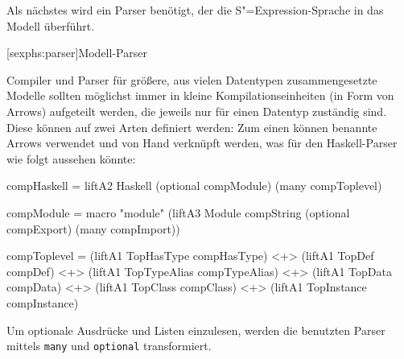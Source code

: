 \documentclass[11pt, a4paper, bibgerm]{scrbook}
\newenvironment{DIFnomarkup}{}{}
\newcommand\icode[1]{\lstinline?#1?}
\newcommand\lsection{}
\newcommand{\sexp}{S"=Expression}
\begin{document}
Als nächstes wird ein Parser benötigt, der die \sexp{}-Sprache in das
Modell überführt.

\lsection[sexphs:parser]{Modell-Parser}

Compiler und Parser für größere, aus vielen Datentypen zusammengesetzte Modelle
sollten möglichst immer in kleine Kompilationseinheiten (in Form von
Arrows) aufgeteilt werden, die jeweils nur für einen Datentyp zuständig
sind. Diese können auf zwei Arten definiert werden: Zum einen können
benannte Arrows verwendet und von Hand verknüpft werden, was für den
Haskell-Parser wie folgt aussehen könnte:
\begin{DIFnomarkup}\begin{code}
compHaskell = liftA2 Haskell (optional compModule) (many compToplevel)

compModule = macro "module" (liftA3 Module
                                    compString
                                    (optional compExport)
                                    (many compImport))

compToplevel = (liftA1 TopHasType   compHasType)   <+>
               (liftA1 TopDef       compDef)       <+>
               (liftA1 TopTypeAlias compTypeAlias) <+>
               (liftA1 TopData      compData)      <+>
               (liftA1 TopClass     compClass)     <+>
               (liftA1 TopInstance  compInstance)
\end{code}\end{DIFnomarkup}
Um optionale Ausdrücke und Listen einzulesen, werden die benutzten Parser
mittels \icode{many} und \icode{optional} transformiert.
\end{document}
